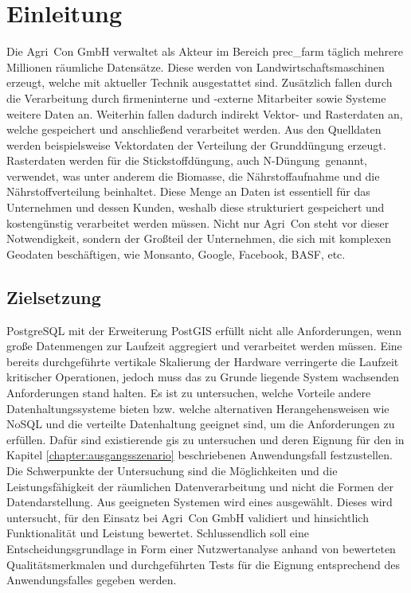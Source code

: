 \chapter{Einleitung}
Die Agri~Con GmbH verwaltet als Akteur im Bereich \Gls{prec_farm} täglich mehrere Millionen räumliche Datensätze.
Diese werden von Landwirtschaftsmaschinen erzeugt, welche mit aktueller Technik ausgestattet sind.
Zusätzlich fallen durch die Verarbeitung durch firmeninterne und -externe Mitarbeiter sowie Systeme weitere Daten an.
Weiterhin fallen dadurch indirekt Vektor- und Rasterdaten an, welche gespeichert und anschließend verarbeitet werden.
Aus den Quelldaten werden beispielsweise Vektordaten der Verteilung der Grunddüngung erzeugt.
Rasterdaten werden für die Stickstoffdüngung, auch \glqq N-Düngung\grqq\ genannt, verwendet, was unter anderem die Biomasse, die Nährstoffaufnahme und die Nährstoffverteilung beinhaltet.
Diese Menge an Daten ist essentiell für das Unternehmen und dessen Kunden, weshalb diese strukturiert gespeichert und kostengünstig verarbeitet werden müssen.
Nicht nur Agri~Con steht vor dieser Notwendigkeit, sondern der Großteil der Unternehmen, die sich mit komplexen Geodaten beschäftigen, wie Monsanto, Google, Facebook, BASF, etc.


\section{Zielsetzung}
PostgreSQL mit der Erweiterung PostGIS erfüllt nicht alle Anforderungen, wenn große Datenmengen zur Laufzeit aggregiert und verarbeitet werden müssen. %
Eine bereits durchgeführte vertikale Skalierung der Hardware verringerte die Laufzeit kritischer Operationen, jedoch muss das zu Grunde liegende System wachsenden Anforderungen stand halten.
Es ist zu untersuchen, welche Vorteile andere Datenhaltungssysteme bieten bzw. welche alternativen Herangehensweisen wie NoSQL und die verteilte Datenhaltung geeignet sind, um die Anforderungen zu erfüllen. %
Dafür sind existierende \Gls{gis} zu untersuchen und deren Eignung für den in Kapitel \ref{chapter:ausgangsszenario} beschriebenen Anwendungsfall festzustellen.
Die Schwerpunkte der Untersuchung sind die Möglichkeiten und die Leistungsfähigkeit der räumlichen Datenverarbeitung und nicht die Formen der Datendarstellung.
Aus geeigneten Systemen wird eines ausgewählt.
Dieses wird untersucht, für den Einsatz bei Agri~Con GmbH validiert und hinsichtlich Funktionalität und Leistung bewertet.
Schlussendlich soll eine Entscheidungsgrundlage in Form einer Nutzwertanalyse anhand von bewerteten Qualitätsmerkmalen und durchgeführten Tests für die Eignung entsprechend des Anwendungsfalles gegeben werden.

